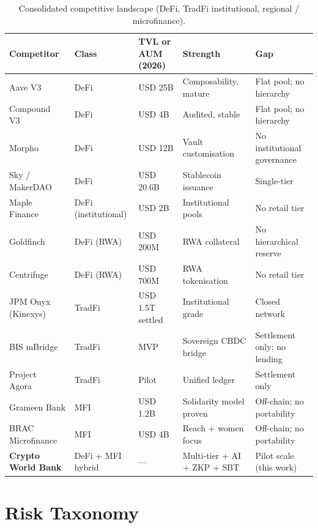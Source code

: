\documentclass[12pt,a4paper]{report}
\begin{document}
\begin{table}[!t]
\centering
\caption{Consolidated competitive landscape (DeFi, TradFi institutional, regional / microfinance).}
\label{tab:competitor-detail}
\small
\setlength{\tabcolsep}{4pt}
\begin{tabularx}{\linewidth}{@{}p{2.4cm}p{1.6cm}p{1.8cm}YY@{}}
\toprule
\textbf{Competitor} & \textbf{Class} & \textbf{TVL or AUM (2026)} & \textbf{Strength} & \textbf{Gap} \\
\midrule
Aave V3~\cite{defillamaAaveV3} & DeFi & USD 25B & Composability, mature & Flat pool; no hierarchy \\
Compound V3~\cite{defillamaCompoundV3} & DeFi & USD 4B & Audited, stable & Flat pool; no hierarchy \\
Morpho~\cite{morphoData} & DeFi & USD 12B & Vault customisation & No institutional governance \\
Sky / MakerDAO~\cite{fensorySky2026} & DeFi & USD 20.6B & Stablecoin issuance & Single-tier \\
Maple Finance~\cite{fensoryMaple2026} & DeFi (institutional) & USD 2B & Institutional pools & No retail tier \\
Goldfinch & DeFi (RWA) & USD 200M & RWA collateral & No hierarchical reserve \\
Centrifuge~\cite{centrifugeRwa2025} & DeFi (RWA) & USD 700M & RWA tokenisation & No retail tier \\
JPM Onyx (Kinexys)~\cite{jpmKinexys2025} & TradFi & USD 1.5T settled & Institutional grade & Closed network \\
BIS mBridge~\cite{bisMbridge2024} & TradFi & MVP & Sovereign CBDC bridge & Settlement only; no lending \\
Project Agora~\cite{bisAgora2024} & TradFi & Pilot & Unified ledger & Settlement only \\
Grameen Bank & MFI & USD 1.2B & Solidarity model proven & Off-chain; no portability \\
BRAC Microfinance~\cite{brac2025microfinance} & MFI & USD 4B & Reach + women focus & Off-chain; no portability \\
\textbf{Crypto World Bank} & DeFi + MFI hybrid & --- & Multi-tier + AI + ZKP + SBT & Pilot scale (this work) \\
\bottomrule
\end{tabularx}
\end{table}

\section{Risk Taxonomy}
\label{sec:risk-taxonomy}
\end{document}
